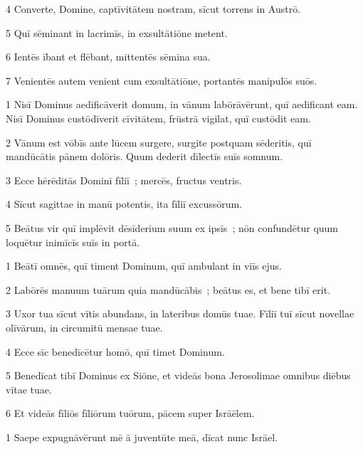 \psalmVerse
  {\phantom{00}4}
  {Converte, Domine, captīvitātem nostram, sīcut torrens in Austrō.}


\psalmVerse
  {\phantom{00}5}
  {Quī sēminant in lacrimīs, in exsultātiōne metent.}


\psalmVerse
  {\phantom{00}6}
  {Ientēs ībant et flēbant, mittentēs sēmina sua.}


\psalmVerse
  {\phantom{00}7}
  {Venientēs autem venient cum exsultātiōne, portantēs manipulōs suōs.}



\psalmVerse
  {\phantom{00}1}
  {Nisī Dominus aedificāverit domum, in vānum labōrāvērunt, quī aedificant eam. Nisī Dominus custōdīverit cīvitātem, frūstrā vigilat, quī custōdit eam.}


\psalmVerse
  {\phantom{00}2}
  {Vānum est vōbīs ante lūcem surgere, surgite postquam sēderitis, quī mandūcātis pānem dolōris. Quum dederit dīlectīs suīs somnum.}


\psalmVerse
  {\phantom{00}3}
  {Ecce hērēditās Dominī fīliī~; mercēs, fructus ventris.}


\psalmVerse
  {\phantom{00}4}
  {Sīcut sagittae in manū potentis, ita fīliī excussōrum.}


\psalmVerse
  {\phantom{00}5}
  {Beātus vir quī implēvit dēsīderium suum ex ipsīs~; nōn confundētur quum loquētur inimīcīs suīs in portā.}



\psalmVerse
  {\phantom{00}1}
  {Beātī omnēs, quī timent Dominum, quī ambulant in viīs ejus.}


\psalmVerse
  {\phantom{00}2}
  {Labōrēs manuum tuārum quia mandūcābis~; beātus es, et bene tibī erit.}


\psalmVerse
  {\phantom{00}3}
  {Uxor tua sīcut vītis abundans, in lateribus domūs tuae. Fīliī tuī sīcut novellae olīvārum, in circumitū mensae tuae.}


\psalmVerse
  {\phantom{00}4}
  {Ecce sīc benedīcētur homō, quī timet Dominum.}


\psalmVerse
  {\phantom{00}5}
  {Benedīcat tibī Dominus ex Siōne, et videās bona Jerosolimae omnibus diēbus vītae tuae.}


\psalmVerse
  {\phantom{00}6}
  {Et videās fīliōs fīliōrum tuōrum, pācem super Isrāēlem.}



\psalmVerse
  {\phantom{00}1}
  {Saepe expugnāvērunt mē ā juventūte meā, dīcat nunc Isrāel.}


